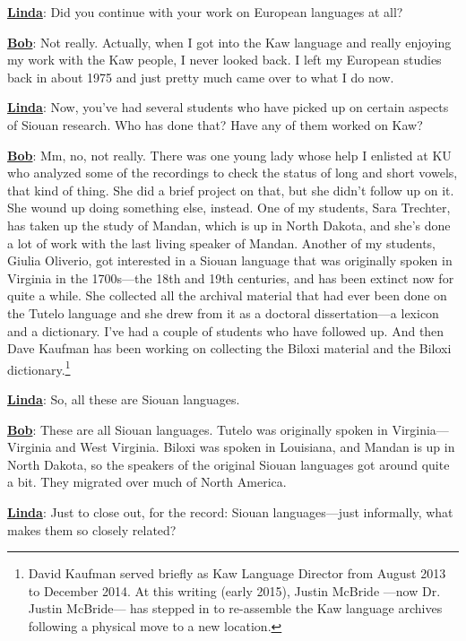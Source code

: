 \documentclass[output=paper]{LSP/langsci}
\begin{document}
\textbf{\underline{Linda}}: Did you continue with your work on European languages at all?

\textbf{\underline{Bob}}: Not really. Actually, when I got into the Kaw language and really enjoying my work with the Kaw people, I never looked back. I left my European studies back in about 1975 and just pretty much came over to what I do now.

\textbf{\underline{Linda}}: Now, you've had several students who have picked up on certain aspects of Siouan research. Who has done that? Have any of them worked on Kaw?

\textbf{\underline{Bob}}: Mm, no, not really. There was one young lady whose help I enlisted at KU who analyzed some of the recordings to check the status of long and short vowels, that kind of thing. She did a brief project on that, but she didn't follow up on it. She wound up doing something else, instead. One of my students, Sara Trechter, has taken up the study of Mandan, which is up in North Dakota, and she's done a lot of work with the last living speaker of Mandan. Another of my students, Giulia Oliverio, got interested in a Siouan language that was originally spoken in Virginia in the 1700s---the 18th and 19th centuries, and has been extinct now for quite a while. She collected all the archival material that had ever been done on the Tutelo language and she drew from it as a doctoral dissertation---a lexicon and a dictionary. I've had a couple of students who have followed up. And then Dave Kaufman has been working on collecting the Biloxi material and the Biloxi dictionary.\footnote{David Kaufman served briefly as Kaw Language Director from August 2013 to December 2014. At this writing (early 2015), Justin McBride ---now Dr. Justin McBride--- has stepped in to re-assemble the Kaw language archives following a physical move to a new location.}

\textbf{\underline{Linda}}: So, all these are Siouan languages.

\textbf{\underline{Bob}}: These are all Siouan languages. Tutelo was originally spoken in Virginia---Virginia and West Virginia. Biloxi was spoken in Louisiana, and Mandan is up in North Dakota, so the speakers of the original Siouan languages got around quite a bit. They migrated over much of North America.

\textbf{\underline{Linda}}: Just to close out, for the record: Siouan languages---just informally, what makes them so closely related?
\end{document}
